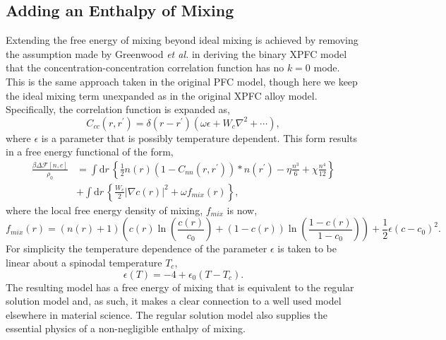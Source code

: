 \documentclass[showkeys, prb, reprint]{revtex4-1}
\renewcommand{\d}{\delta}       %
\newcommand{\F}{\mathcal{F}}    %
\renewcommand{\l}{\left}        %
\renewcommand{\r}{\right}       %
\newcommand{\f}{\frac}          %
\newcommand{\integrate}[1]{\int \mathrm{d}#1\,}
\begin{document}
\subsection{Adding an Enthalpy of Mixing} %

Extending the free energy of mixing beyond ideal mixing is achieved by removing
the assumption made by Greenwood \textit{et al.} in deriving the binary XPFC
model that the concentration-concentration correlation function has no $k=0$
mode. This is the same approach taken in the original PFC model, though here we
keep the ideal mixing term unexpanded as in the original XPFC alloy model.
Specifically, the correlation function is expanded as,
%
\begin{equation}
    C_{cc}(r, r^\prime) = \d(r - r^\prime)
        \l(\omega\epsilon + W_c\nabla^2 + \cdots\r),
\end{equation}
%
where $\epsilon$ is a parameter that is possibly temperature dependent. This
form results in a free energy functional of the form,
%
\begin{align}
    \f{\beta\Delta\F[n, c]}{\rho_0} &= \integrate{r} \l\lbrace
        \f{1}{2} n(r) \l(1 - C_{nn}(r, r^\prime)\r) \ast n(r^\prime)
        - \eta \f{n^3}{6} + \chi \f{n^4}{12} \r\rbrace \\
        &+ \integrate{r}\l\lbrace
            \f{W_c}{2}\l\vert \nabla c(r) \r\vert^2 + \omega f_{mix}(r)
            \r\rbrace, \nonumber
\end{align}
%
where the local free energy density of mixing, $f_{mix}$ is now,
%
\begin{equation}
    f_{mix}(r) = \l(n(r) + 1\r)\l(
            c(r)\ln\l(\f{c(r)}{c_0}\r)
          + (1-c(r))\ln\l(\f{1-c(r)}{1-c_0}\r) \r)
          + \f{1}{2} \epsilon (c - c_0)^2.
\end{equation}
%
For simplicity the temperature dependence of the parameter $\epsilon$ is taken
to be linear about a spinodal temperature $T_c$,
%
\begin{equation}
    \label{eq:spinodal_model}
    \epsilon(T) = -4 + \epsilon_0(T - T_c).
\end{equation}
%
The resulting model has a free energy of mixing that is equivalent to the
regular solution model and, as such, it makes a clear connection to a well used
model elsewhere in material science. The regular solution model also supplies
the essential physics of a non-negligible enthalpy of mixing. 
\end{document}
